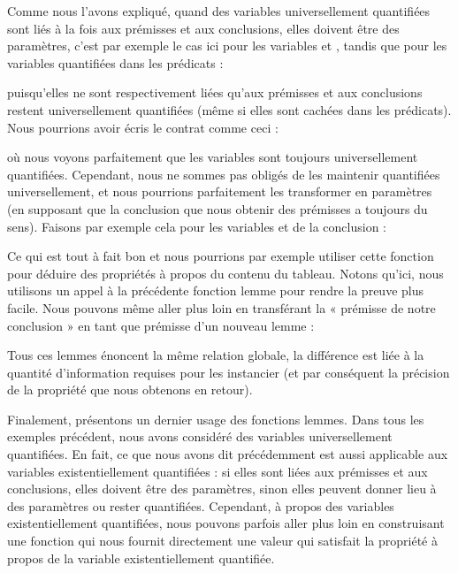 Comme nous l'avons expliqué, quand des variables universellement quantifiées
sont liés à la fois aux prémisses et aux conclusions, elles doivent être des
paramètres, c'est par exemple le cas ici pour les variables 
et , tandis que pour les variables quantifiées dans les
prédicats :





puisqu'elles ne sont respectivement liées qu'aux prémisses et aux conclusions
restent universellement quantifiées (même si elles sont cachées dans les
prédicats). Nous pourrions avoir écris le contrat comme ceci :





où nous voyons parfaitement que les variables sont toujours universellement
quantifiées. Cependant, nous ne sommes pas obligés de les maintenir quantifiées
universellement, et nous pourrions parfaitement les transformer en paramètres
(en supposant que la conclusion que nous obtenir des prémisses a toujours du
sens). Faisons par exemple cela pour les variables  et
 de la conclusion :




Ce qui est tout à fait bon et nous pourrions par exemple utiliser cette fonction
pour déduire des propriétés à propos du contenu du tableau. Notons qu'ici, nous
utilisons un appel à la précédente fonction lemme pour rendre la preuve
plus facile. Nous pouvons même aller plus loin en transférant la « prémisse de
notre conclusion » en tant que prémisse d'un nouveau lemme :





Tous ces lemmes énoncent la même relation globale, la différence est liée à la
quantité d'information requises pour les instancier (et par conséquent la 
précision de la propriété que nous obtenons en retour).


Finalement, présentons un dernier usage des fonctions lemmes. Dans tous les 
exemples précédent, nous avons considéré des variables universellement quantifiées.
En fait, ce que nous avons dit précédemment est aussi applicable aux variables
existentiellement quantifiées : si elles sont liées aux prémisses et aux
conclusions, elles doivent être des paramètres, sinon elles peuvent donner lieu
à des paramètres ou rester quantifiées. Cependant, à propos des variables
existentiellement quantifiées, nous pouvons parfois aller plus loin en construisant
une fonction qui nous fournit directement une valeur qui satisfait la propriété
à propos de la variable existentiellement quantifiée.



